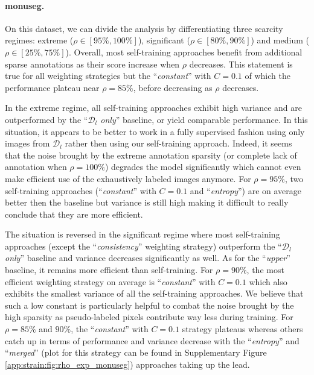 \paragraph{\acrshort{monuseg}.} On this dataset, we can divide the analysis by differentiating three scarcity regimes: extreme ($\rho \in [95\%, 100\%]$), significant ($\rho \in [80\%, 90\%]$) and medium ($\rho \in [25\%, 75\%]$). Overall, most self-training approaches benefit from additional sparse annotations as their score increase when $\rho$ decreases. This statement is true for all weighting strategies but the ``\textit{constant}'' with $C = 0.1$ of which the performance plateau near $\rho = 85\%$, before decreasing as $\rho$ decreases. 

In the extreme regime, all self-training approaches exhibit high variance and are outperformed by the ``\textit{$\mathcal{D}_l$ only}'' baseline, or yield comparable performance. In this situation, it appears to be better to work in a fully supervised fashion using only images from $\mathcal{D}_l$ rather then using our self-training approach. Indeed, it seems that the noise brought by the extreme annotation sparsity (or complete lack of annotation when $\rho = 100\%$) degrades the model significantly which cannot even make efficient use of the exhaustively labeled images anymore. For $\rho = 95\%$, two self-training approaches (``\textit{constant}'' with $C = 0.1$ and ``\textit{entropy}'') are on average better then the baseline but variance is still high making it difficult to really conclude that they are more efficient. 

The situation is reversed in the significant regime where most self-training approaches (except the ``\textit{consistency}'' weighting strategy) outperform the ``\textit{$\mathcal{D}_l$ only}'' baseline and variance decreases significantly as well. As for the ``\textit{upper}'' baseline, it remains more efficient than self-training. For $\rho = 90\%$, the most efficient weighting strategy on average is ``\textit{constant}'' with $C = 0.1$ which also exhibits the smallest variance of all the self-training approaches. We believe that such a low constant is particularly helpful to combat the noise brought by the high sparsity as pseudo-labeled pixels contribute way less during training. For $\rho = 85\%$ and $90\%$, the ``\textit{constant}'' with $C = 0.1$ strategy plateaus whereas others catch up in terms of performance and variance decrease with the ``\textit{entropy}'' and ``\textit{merged}'' (plot for this strategy can be found in Supplementary Figure \ref{app:strain:fig:rho_exp_monuseg}) approaches taking up the lead.

